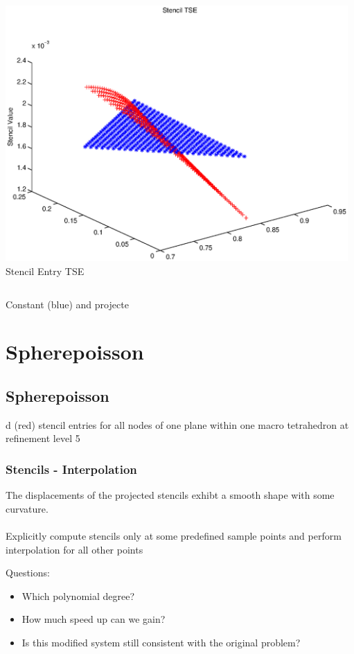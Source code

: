 \documentclass[t,compress=false,usepdftitle=false]{beamer}
\begin{document}
\begin{frame}
\begin{columns}[T]
\begin{column}[T]{4.1cm}
  \centering
  \includegraphics[width=0.98\textwidth]{stencilTSE_nE}\\
  Stencil Entry TSE
\end{column}
\end{columns}
\vspace{0.5cm}
\centering
Constant (blue) and projecte%
%
\section{Spherepoisson}
\subsection{Spherepoisson}d (red) stencil entries for all nodes of one plane
within one macro tetrahedron at refinement level 5


\end{frame}

%
%
\begin{frame}\frametitle{Stencils - Interpolation}


 The displacements of the projected stencils exhibt
a smooth shape with some curvature.\\
\vspace{4ex}
\\
\vspace{4ex} 
 Explicitly compute stencils only at some predefined sample
points and perform interpolation for all other points 

Questions: 
\begin{itemize}
\item{Which polynomial degree?}
\item{How much speed up can we gain?}
\item{Is this modified system still consistent with the original problem? }
\end{itemize}



\end{frame}
\end{document}
